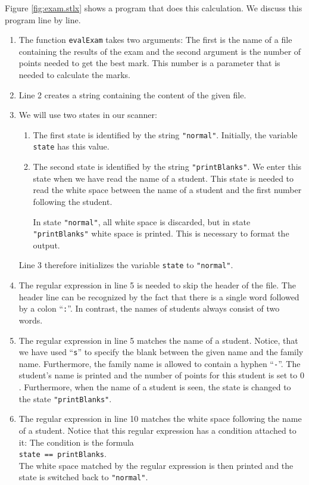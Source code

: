 Figure \ref{fig:exam.stlx} shows a program that does this calculation.  We discuss this
program line by line.
\begin{enumerate}
\item The function \texttt{evalExam} takes two arguments:  The first is the name of a file
      containing the results of the exam and the second argument is the number of points 
      needed to get the best mark.  This number is a parameter that is needed to calculate
      the marks.
\item Line 2 creates a string containing the content of the given file.
\item We will use two states in our scanner:
      \begin{enumerate}
      \item The first state is identified by the string \texttt{"normal"}.
            Initially, the variable \texttt{state} has this value.
      \item The second state is identified by the string \texttt{"printBlanks"}. 
            We enter this state when we have read the name of a student.
            This state is needed to read the white space between the name of a student 
            and the first number following the student.

            In state \texttt{"normal"}, all white space is discarded, but in state
            \texttt{"printBlanks"} white space is printed.  This is necessary to format
            the output.
      \end{enumerate}
      Line 3 therefore initializes the variable \texttt{state} to \texttt{"normal"}.
\item The regular expression in line 5 is needed to skip the header of the file.  The
      header line can be recognized by the fact that there is a single word followed by a colon
      ``\texttt{:}''.   In contrast, the names of students always consist of two words.
\item The regular expression in line 5 matches the name of a student.  Notice, that we have used 
      ``\texttt{s}'' to specify the blank between the given name and the family name.
      Furthermore, the family name is allowed to contain a hyphen ``\texttt{-}''.
      The student's name is printed and the number of points for this student is set to $0$.
      Furthermore, when the name of a student is seen, the state is changed to the state
      \texttt{"printBlanks"}.
\item The regular expression in line 10 matches the white space following the name of a
      student.  Notice that this regular expression has a condition attached to it: 
      The condition is the formula
      \\[0.2cm]
      \hspace*{1.3cm}
      \texttt{state == printBlanks}.
      \\[0.2cm]
      The white space matched by the regular expression is then printed and the state is switched back to
      \texttt{"normal"}.


\end{enumerate}
